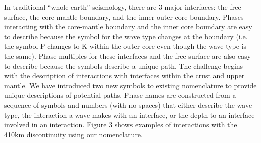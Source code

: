 In traditional ``whole-earth'' seismology, there are 3 major interfaces:  the free
surface, the core-mantle boundary, and the inner-outer core boundary.  
Phases interacting with the core-mantle boundary and the inner core boundary are easy to
describe because the symbol for the wave type changes at the boundary (i.e. the symbol P
changes to K within the outer core even though the wave type is the same).
Phase multiples for these interfaces and the free surface are also easy to describe because 
the symbols describe a unique path.  
The challenge begins with the description of interactions with interfaces within the
crust and upper mantle.  
We have introduced two new symbols to existing
nomenclature to provide unique descriptions of potential paths.
Phase names are constructed from a sequence of symbols and numbers (with no spaces) 
that either describe the wave type, the interaction a wave makes with an interface, or
the depth to an interface involved in an interaction.
Figure 3 shows examples of interactions with the 410km discontinuity using our
nomenclature.

